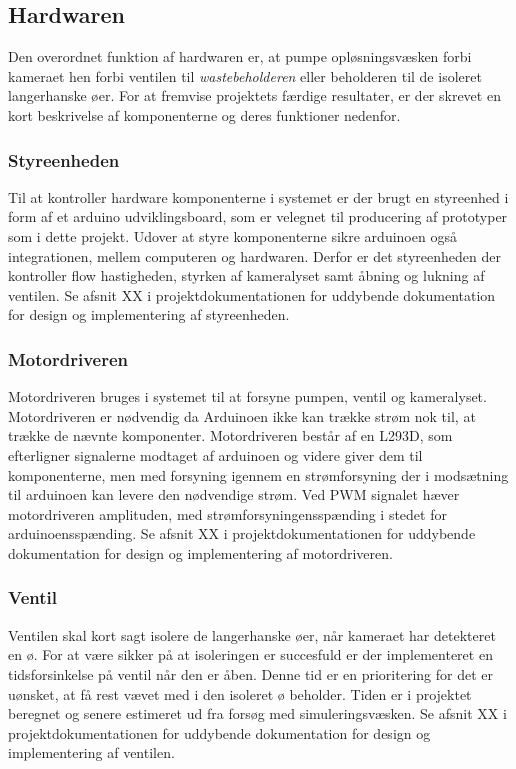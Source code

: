 \subsection{Hardwaren}
Den overordnet funktion af hardwaren er, at pumpe opløsningsvæsken forbi kameraet hen forbi ventilen til \textit{wastebeholderen} eller beholderen til de isoleret langerhanske øer. For at fremvise projektets færdige resultater, er der skrevet en kort beskrivelse af komponenterne og deres funktioner nedenfor.

\subsubsection{Styreenheden} 
Til at kontroller hardware komponenterne i systemet er der brugt en styreenhed i form af et arduino udviklingsboard, som er velegnet til producering af prototyper som i dette projekt. Udover at styre komponenterne sikre arduinoen også integrationen, mellem computeren og hardwaren. Derfor er det styreenheden der kontroller flow hastigheden, styrken af kameralyset samt åbning og lukning af ventilen. Se afsnit XX i projektdokumentationen for uddybende dokumentation for design og implementering af styreenheden.

\subsubsection{Motordriveren}
Motordriveren bruges i systemet til at forsyne pumpen, ventil og kameralyset. Motordriveren er nødvendig da Arduinoen ikke kan trække strøm nok til, at trække de nævnte komponenter. Motordriveren består af en L293D, som efterligner signalerne modtaget af arduinoen og videre giver dem til komponenterne, men med forsyning igennem en strømforsyning der i modsætning til arduinoen kan levere den nødvendige strøm. Ved PWM signalet hæver motordriveren amplituden, med strømforsyningensspænding i stedet for arduinoensspænding. Se afsnit XX i projektdokumentationen for uddybende dokumentation for design og implementering af motordriveren.

\subsubsection{Ventil}
Ventilen skal kort sagt isolere de langerhanske øer, når kameraet har detekteret en ø. For at være sikker på at isoleringen er succesfuld er der implementeret en tidsforsinkelse på ventil når den er åben. Denne tid er en prioritering for det er uønsket, at få rest vævet med i den isoleret ø beholder. Tiden er i projektet beregnet og senere estimeret ud fra forsøg med simuleringsvæsken. Se afsnit XX i projektdokumentationen for uddybende dokumentation for design og implementering af ventilen.

